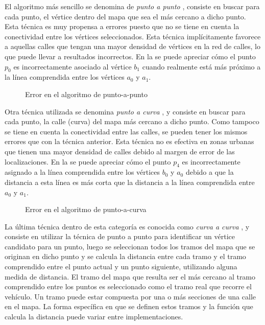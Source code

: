 El algoritmo más sencillo se denomina de \emph{punto a punto} \cite{white2000some}, consiste en buscar para cada punto, el vértice dentro del mapa que sea el más cercano a dicho punto. Esta técnica es muy propensa a errores puesto que no se tiene en cuenta la conectividad entre los vértices seleccionados. Esta técnica implícitamente favorece a aquellas calles que tengan una mayor densidad de vértices en la red de calles, lo que puede llevar a resultados incorrectos. En la  se puede apreciar cómo el punto $p_0$ es incorrectamente asociado al vértice $b_1$ cuando realmente está más próximo a la línea comprendida entre los vértices $a_0$ y $a_1$.

\begin{figure}[h]
	\centering
	
	\caption{Error en el algoritmo de punto-a-punto}
	\label{fig:punto-a-punto} 
\end{figure}

Otra técnica utilizada se denomina \emph{punto a curva} \cite{white2000some}, y consiste en buscar para cada punto, la calle (curva) del mapa más cercano a dicho punto. Como tampoco se tiene en cuenta la conectividad entre las calles, se pueden tener los mismos errores que con la técnica anterior. Esta técnica no es efectiva en zonas urbanas que tienen una mayor densidad de calles debido al margen de error de las localizaciones. En la  se puede apreciar cómo el punto $p_4$ es incorrectamente asignado a la línea comprendida entre los vértices $b_0$ y $a_0$ debido a que la distancia a esta línea es más corta que la distancia a la línea comprendida entre $a_0$ y $a_1$.

\begin{figure}[h]
	\centering
	
	\caption{Error en el algoritmo de punto-a-curva}
	\label{fig:punto-a-curva} 
\end{figure}

La última técnica dentro de esta categoría es conocida como \emph{curva a curva} \cite{white2000some}, y consiste en  utilizar la técnica de punto a punto para identificar un vértice candidato para un punto, luego se seleccionan todos los tramos del mapa que se originan en dicho punto y se calcula la distancia entre cada tramo y el tramo comprendido entre el punto actual y un punto siguiente, utilizando alguna medida de distancia. El tramo del mapa que resulta ser el más cercano al tramo comprendido entre los puntos es seleccionado como el tramo real que recorre el vehículo. Un tramo puede estar compuesta por una o más secciones de una calle en el mapa. La forma específica en que se definen estos tramos y la función que calcula la distancia puede variar entre implementaciones.

